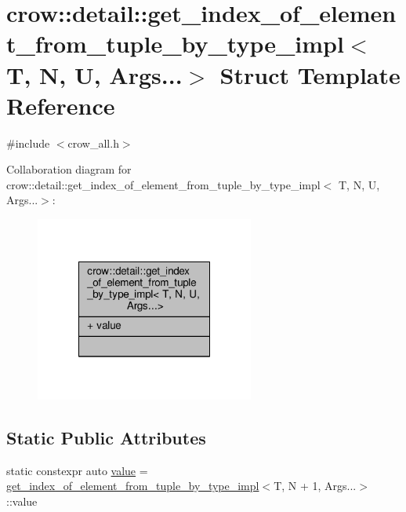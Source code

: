 \hypertarget{structcrow_1_1detail_1_1get__index__of__element__from__tuple__by__type__impl_3_01_t_00_01_n_00_01_u_00_01_args_8_8_8_4}{\section{crow\-:\-:detail\-:\-:get\-\_\-index\-\_\-of\-\_\-element\-\_\-from\-\_\-tuple\-\_\-by\-\_\-type\-\_\-impl$<$ T, N, U, Args...$>$ Struct Template Reference}
\label{structcrow_1_1detail_1_1get__index__of__element__from__tuple__by__type__impl_3_01_t_00_01_n_00_01_u_00_01_args_8_8_8_4}
}


{\ttfamily \#include $<$crow\-\_\-all.\-h$>$}



Collaboration diagram for crow\-:\-:detail\-:\-:get\-\_\-index\-\_\-of\-\_\-element\-\_\-from\-\_\-tuple\-\_\-by\-\_\-type\-\_\-impl$<$ T, N, U, Args...$>$\-:
\nopagebreak
\begin{figure}[H]
\begin{center}
\leavevmode
\includegraphics[width=204pt]{structcrow_1_1detail_1_1get__index__of__element__from__tuple__by__type__impl_3_01_t_00_01_n_00_00b548d17ecf98cfb4bde88fa9296a398}
\end{center}
\end{figure}
\subsection*{Static Public Attributes}
\begin{DoxyCompactItemize}
\item 
static constexpr auto \hyperlink{structcrow_1_1detail_1_1get__index__of__element__from__tuple__by__type__impl_3_01_t_00_01_n_00_01_u_00_01_args_8_8_8_4_a5caffa263c0c6d186e32e158c3dc8aee}{value} = \hyperlink{structcrow_1_1detail_1_1get__index__of__element__from__tuple__by__type__impl}{get\-\_\-index\-\_\-of\-\_\-element\-\_\-from\-\_\-tuple\-\_\-by\-\_\-type\-\_\-impl}$<$T, N + 1, Args...$>$\-::value
\end{DoxyCompactItemize}


